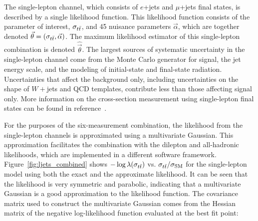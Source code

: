 The single-lepton channel, which consists of $e$+jets and $\mu$+jets final states, is described by a single likelihood function.
This likelihood function consists of the parameter of interest, $\sigma_{t\bar{t}}$, and 45 nuisance parameters $\vec{\alpha}$, 
which are together denoted $\vec{\theta} = (\sigma_{t\bar{t}}, \vec{\alpha})$.
The maximum likelihood estimator of this single-lepton combination is denoted $\hat{\vec{\theta}}$.
The largest sources of systematic uncertainty in the single-lepton channel come from the Monte Carlo generator for signal, the jet energy scale, and the modeling of initial-state and final-state radiation.
Uncertainties that affect the background only, including uncertainties on the shape of $W+$jets and QCD templates, contribute less than those affecting signal only.
More information on the cross-section measurement using single-lepton final states can be found in reference~\cite{LEPTON_JETS_NOTE_2011}.

For the purposes of the six-measurement combination, the likelihood from the single-lepton channels is approximated using a multivariate Gaussian.
This approximation facilitates the combination with the dilepton and all-hadronic likelihoods, which are implemented in a different software framework.  
Figure~\ref{fig:ljets_combined} shows $-\log\lambda(\sigma_{t\bar{t}})$ vs. $\sigma_{t\bar{t}}/\sigma_{\rm SM}$ for the single-lepton model using both the exact and the approximate likelihood.
It can be seen that the likelihood is very symmetric and parabolic, indicating that a multivariate Gaussian is a good approximation to the likelihood function. 
The covariance matrix used to construct the multivariate Gaussian comes from the Hessian matrix of the negative log-likelihood function evaluated at the best fit point:






